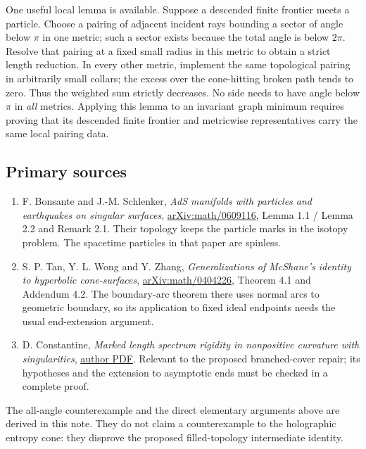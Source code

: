 \documentclass[11pt]{article}
\providecommand{\tightlist}{\setlength{\itemsep}{1pt}\setlength{\parskip}{0pt}}
\begin{document}
One useful local lemma is available. Suppose a descended finite frontier
meets a particle. Choose a pairing of adjacent incident rays bounding a
sector of angle below \(\pi\) in one metric; such a sector exists
because the total angle is below \(2\pi\). Resolve that pairing at a
fixed small radius in this metric to obtain a strict length reduction.
In every other metric, implement the same topological pairing in
arbitrarily small collars; the excess over the cone-hitting broken path
tends to zero. Thus the weighted sum strictly decreases. No side needs
to have angle below \(\pi\) in \emph{all} metrics. Applying this lemma
to an invariant graph minimum requires proving that its descended finite
frontier and metricwise representatives carry the same local pairing
data.

\subsection{Primary sources}\label{primary-sources}

\begin{enumerate}
\def\labelenumi{\arabic{enumi}.}
\tightlist
\item
  F. Bonsante and J.-M. Schlenker, \emph{AdS manifolds with particles
  and earthquakes on singular surfaces},
  \href{https://arxiv.org/abs/math/0609116}{arXiv:math/0609116}, Lemma
  1.1 / Lemma 2.2 and Remark 2.1. Their topology keeps the particle
  marks in the isotopy problem. The spacetime particles in that paper
  are spinless.
\item
  S. P. Tan, Y. L. Wong and Y. Zhang, \emph{Generalizations of McShane's
  identity to hyperbolic cone-surfaces},
  \href{https://arxiv.org/abs/math/0404226}{arXiv:math/0404226}, Theorem
  4.1 and Addendum 4.2. The boundary-arc theorem there uses normal arcs
  to geometric boundary, so its application to fixed ideal endpoints
  needs the usual end-extension argument.
\item
  D. Constantine, \emph{Marked length spectrum rigidity in nonpositive
  curvature with singularities},
  \href{https://dconstantine.faculty.wesleyan.edu/files/2019/08/MLSnonpos.pdf}{author
  PDF}. Relevant to the proposed branched-cover repair; its hypotheses
  and the extension to asymptotic ends must be checked in a complete
  proof.
\end{enumerate}

The all-angle counterexample and the direct elementary arguments above
are derived in this note. They do not claim a counterexample to the
holographic entropy cone: they disprove the proposed filled-topology
intermediate identity.
\end{document}
